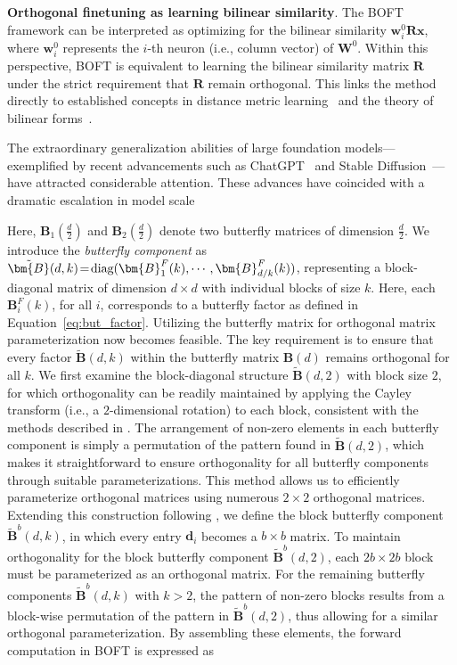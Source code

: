 \textbf{Orthogonal finetuning as learning bilinear similarity}. The BOFT framework can be interpreted as optimizing for the bilinear similarity $\bm{w}^0_i\bm{R}\bm{x}$, where $\bm{w}^0_i$ represents the $i$-th neuron (i.e., column vector) of $\bm{W}^0$. Within this perspective, BOFT is equivalent to learning the bilinear similarity matrix $\bm{R}$ under the strict requirement that $\bm{R}$ remain orthogonal. This links the method directly to established concepts in distance metric learning~\cite{xing2002distance} and the theory of bilinear forms~\cite{roman2005advanced}.

The extraordinary generalization abilities of large foundation models—exemplified by recent advancements such as ChatGPT~\cite{brown2020language,chen2021evaluating} and Stable Diffusion~\cite{rombach2022high}—have attracted considerable attention. These advances have coincided with a dramatic escalation in model scale

Here, $\bm{B}_1(\frac{d}{2})$ and $\bm{B}_2(\frac{d}{2})$ denote two butterfly matrices of dimension $\frac{d}{2}$. We introduce the \emph{butterfly component} as $\thickmuskip=2mu \medmuskip=2mu \tilde{\bm{B}}(d,k)=\text{diag}(\bm{B}^F_1(k),\cdots,\bm{B}^F_{d/k}(k))$, representing a block-diagonal matrix of dimension $d\times d$ with individual blocks of size $k$. Here, each $\bm{B}^F_i(k)$, for all $i$, corresponds to a butterfly factor as defined in Equation~\ref{eq:but_factor}. Utilizing the butterfly matrix for orthogonal matrix parameterization now becomes feasible. The key requirement is to ensure that every factor $\tilde{\bm{B}}(d,k)$ within the butterfly matrix $\bm{B}(d)$ remains orthogonal for all $k$. We first examine the block-diagonal structure $\tilde{\bm{B}}(d,2)$ with block size $2$, for which orthogonality can be readily maintained by applying the Cayley transform (i.e., a $2$-dimensional rotation) to each block, consistent with the methods described in \cite{liu2021orthogonal,qiu2023controlling}. The arrangement of non-zero elements in each butterfly component is simply a permutation of the pattern found in $\tilde{\bm{B}}(d,2)$, which makes it straightforward to ensure orthogonality for all butterfly components through suitable parameterizations. This method allows us to efficiently parameterize orthogonal matrices using numerous $2\times 2$ orthogonal matrices. Extending this construction following \cite{chen2022pixelated}, we define the block butterfly component $\tilde{\bm{B}}^b(d,k)$, in which every entry $\bm{d}_i$ becomes a $b\times b$ matrix. To maintain orthogonality for the block butterfly component $\tilde{\bm{B}}^b(d,2)$, each $2b\times 2b$ block must be parameterized as an orthogonal matrix. For the remaining butterfly components $\tilde{\bm{B}}^b(d,k)$ with $k>2$, the pattern of non-zero blocks results from a block-wise permutation of the pattern in $\tilde{\bm{B}}^b(d,2)$, thus allowing for a similar orthogonal parameterization. By assembling these elements, the forward computation in BOFT is expressed as

